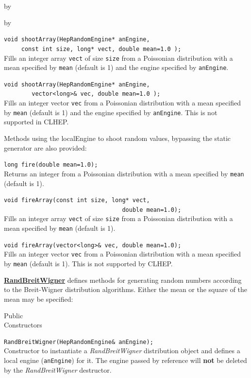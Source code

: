 \documentclass[twoside]{article}
\newcommand{\comp}[1]{\texttt{#1}}%
\newcommand{\entrylabel}[1]{\mbox{\textbf{{#1}}}\hfil}%
\newenvironment{entry}
{\begin{list}{}%
    {\renewcommand{\makelabel}{\entrylabel}%
     \setlength{\labelwidth}{90pt}%
     \setlength{\leftmargin}{\labelwidth}
     \advance\leftmargin by \labelsep%
      }%
    }%
  {\end{list}}
\newcommand{\Entrylabel}[1]%
{\raisebox{0pt}[1ex][0pt]{\makebox[\labelwidth][l]%
    {\parbox[t]{\labelwidth}{\hspace{0pt}\textbf{{#1}}}}}}
\newenvironment{Entry}%
{\renewcommand{\entrylabel}{\Entrylabel}\begin{entry}}%
  {\end{entry}}
\begin{document}
\begin{description}
\begin{Entry}
\begin{Entry}
    \verb+void shootArray(HepRandomEngine* anEngine,+\\
    \verb+     const int size, long* vect, double mean=1.0 );+\\
    Fills an integer array \comp{vect} of size \comp{size} from a
    Poissonian distribution with a mean specified by \comp{mean}
    (default is 1) and the engine specified by \comp{anEngine}.

    \verb+void shootArray(HepRandomEngine* anEngine,+\\
    \verb+        vector<long>& vec, double mean=1.0 );+\\
    Fills an integer vector \comp{vec} from a
    Poissonian distribution with a mean specified by \comp{mean}
    (default is 1) and the engine specified by \comp{anEngine}.
    This is not supported in CLHEP.
    
    Methods using the localEngine to shoot random values, bypassing
    the static generator are also provided:

    \verb+long fire(double mean=1.0);+\\
    Returns an integer from a Poissonian distribution with a mean
    specified by \comp{mean} (default is 1).
  
    \verb+void fireArray(const int size, long* vect,+\\
    \verb+                                  double mean=1.0);+\\
    Fills an integer array \comp{vect} of size \comp{size} from a
    Poissonian distribution with a mean specified by \comp{mean}
    (default is 1).

    \verb+void fireArray(vector<long>& vec, double mean=1.0);+\\
    Fills an integer vector \comp{vec} from a
    Poissonian distribution with a mean specified by \comp{mean}
    (default is 1).  This is not supported by CLHEP.
  
    \begin{description}
      \item \underline{\bf RandBreitWigner}  defines methods for generating random
        numbers according to the Breit-Wigner distribution algorithms.
        Either the mean or the square of the mean may be specified:
    \end{description}
    
\item[Public\\ Constructors]

    \verb+RandBreitWigner(HepRandomEngine& anEngine);+\\
    Constructor to instantiate a {\em RandBreitWigner}
    distribution object and defines a local engine (\comp{anEngine})
    for it.  The engine passed by reference will {\bf not} be deleted
    by the {\em RandBreitWigner} destructor.
    

\end{Entry}
\end{Entry}
\end{description}
\end{document}

